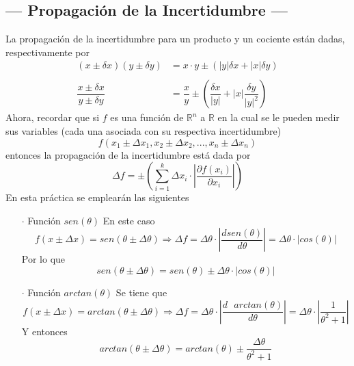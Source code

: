 \documentclass[12pt,a4paper]{article}
\begin{document}
\subsection{--- Propagación de la Incertidumbre ---}
La propagación de la incertidumbre para un producto y un cociente están dadas, respectivamente por
\begin{align*}
(x\pm\delta x)(y\pm\delta y)&=x\cdot y\pm\left(|y|\delta x+|x|\delta y \right)\\\\
\dfrac{x\pm\delta x}{y\pm\delta y}&=\dfrac{x}{y}\pm\left(\dfrac{\delta x}{|y|}+|x|\dfrac{\delta y}{|y|^2}\right)
\end{align*}
Ahora, recordar que si $f$ es una función de $\mathbb{R}^n$ a $\mathbb{R}$ en la cual se le pueden medir sus variables (cada una asociada con su respectiva incertidumbre)
$$f(x_1\pm\Delta x_1,x_2\pm\Delta x_2,...,x_n\pm\Delta x_n)$$
entonces la propagación de la incertidumbre está dada por 
$$\Delta f=\pm\left(\displaystyle\sum_{i=1}^k\Delta x_i\cdot\left|\dfrac{\partial f(x_i)}{\partial x_i}\right| \right)$$
En esta práctica se emplearán las siguientes
\begin{itemize}
\item [$\cdot$] Función $ sen(\theta) $
En este caso
$$f(x\pm\Delta x)=sen(\theta\pm\Delta\theta)\Longrightarrow \Delta f=\Delta\theta\cdot\left|\dfrac{d sen(\theta)}{d\theta}\right|=\Delta\theta\cdot|cos(\theta)|$$
Por lo que 
$$sen(\theta\pm\Delta\theta)=sen(\theta)\pm\Delta\theta\cdot|cos(\theta)|$$
\item [$\cdot$] Función $ arctan(\theta) $
Se tiene que 
$$f(x\pm\Delta x)=arctan(\theta\pm\Delta\theta)\Longrightarrow \Delta f=\Delta\theta\cdot\left|\dfrac{d \mbox{ }arctan(\theta)}{d\theta}\right|=\Delta\theta\cdot\left|\dfrac{1}{\theta^2 + 1 }\right|$$
Y entonces 
$$arctan(\theta\pm\Delta\theta)=arctan(\theta)\pm \dfrac{\Delta\theta}{\theta^2 + 1 }$$
\end{itemize} 

\newpage
\end{document}
